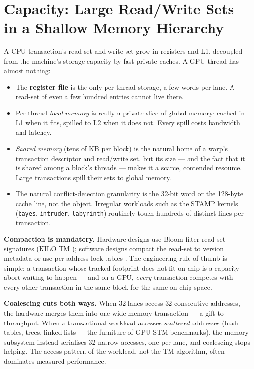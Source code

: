 \section{Capacity: Large Read/Write Sets in a Shallow Memory Hierarchy}
\label{sec:capacity}

A CPU transaction's read-set and write-set grow in registers and L1,
decoupled from the machine's storage capacity by fast private caches. A GPU
thread has almost nothing:

\begin{itemize}
    \item The \textbf{register file} is the only per-thread storage, a few
          words per lane. A read-set of even a few hundred entries cannot
          live there.
    \item Per-thread \emph{local memory} is really a private slice of global
          memory: cached in L1 when it fits, spilled to L2 when it does not.
          Every spill costs bandwidth and latency.
    \item \emph{Shared memory} (tens of KB per block) is the natural home of
          a warp's transaction descriptor and read/write set, but its size
          --- and the fact that it is shared among a block's threads --- makes
          it a scarce, contended resource. Large transactions spill their sets
          to global memory.
    \item The natural conflict-detection granularity is the 32-bit word or
          the 128-byte cache line, not the object. Irregular workloads such as
          the STAMP kernels (\texttt{bayes}, \texttt{intruder},
          \texttt{labyrinth}) \cite{minh08stamp} routinely touch hundreds of
          distinct lines per transaction.
\end{itemize}

\textbf{Compaction is mandatory.} Hardware designs use Bloom-filter read-set
signatures (KILO TM \cite{fung11kilotm}); software designs compact the
read-set to version metadata or use per-address lock tables
\cite{shen15prstm,nunes22csmv}. The engineering rule of thumb is simple: a
transaction whose tracked footprint does not fit on chip is a capacity abort
waiting to happen --- and on a GPU, \emph{every} transaction competes with
every other transaction in the same block for the same on-chip space.

\textbf{Coalescing cuts both ways.} When 32 lanes access 32 consecutive
addresses, the hardware merges them into one wide memory transaction --- a
gift to throughput. When a transactional workload accesses \emph{scattered}
addresses (hash tables, trees, linked lists --- the furniture of GPU STM
benchmarks), the memory subsystem instead serialises 32 narrow accesses, one
per lane, and coalescing stops helping. The access pattern of the workload,
not the TM algorithm, often dominates measured performance.

